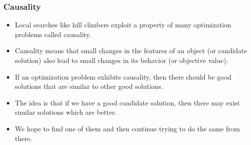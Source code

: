 \documentclass[mathserif]{beamer}%
\begin{document}
\begin{frame}%
\frametitle{Causality}%
\begin{itemize}%
\item Local searches like hill climbers exploit a property of many optimization problems called \alert{causality}\cite{R1973ES,R1994ES,WCT2012EOPABT,WZCN2009WIOD}.%
\item<2-> Causality means that small changes in the features of an object (or candidate solution) also lead to small changes in its behavior (or objective value).%
\item<3-> If an optimization problem exhibits causality, then there should be good solutions that are similar to other good solutions.%
\item<4-> The idea is that if we have a good candidate solution, then there may exist similar solutions which are better.%
\item<5-> We hope to find one of them and then continue trying to do the same from there.%
\end{itemize}%
\end{frame}%
%
\end{document}
